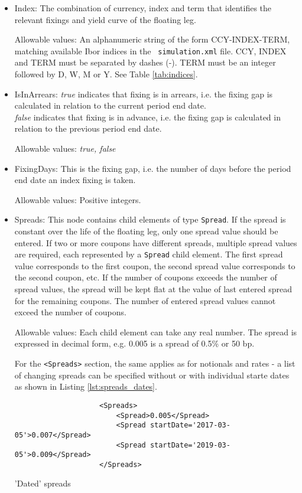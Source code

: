 \begin{itemize}
\item Index:  The combination of currency, index and term that
  identifies the relevant fixings and yield curve of the floating leg.  

  Allowable values: An alphanumeric string of the form CCY-INDEX-TERM, matching available Ibor indices in the {\tt
    simulation.xml} file. CCY, INDEX and TERM must be separated by dashes (-). TERM must be an integer followed by D, W,
  M or Y. See Table \ref{tab:indices}.

\item IsInArrears:  \emph{true} indicates that  fixing is in arrears,
  i.e. the fixing gap is calculated in relation to the current period
  end date.\\ \emph{false} indicates that  fixing is in advance,
  i.e. the fixing gap is calculated in relation to the previous period
  end date.  

Allowable values:  \emph{true, false}

\item FixingDays: This is the fixing gap, i.e. the number of days
  before the period end date an index fixing is taken.   

Allowable values:  Positive integers.  

\item Spreads: This node contains child elements of type
  \lstinline!Spread!. If the spread is constant over the life of the
  floating leg, only one spread value should be entered. If two or more
  coupons have different spreads, multiple spread values are required,
  each represented by a \lstinline!Spread! child element. The first
  spread value corresponds to the first coupon, the second spread
  value corresponds to the second coupon, etc. If the number of
  coupons exceeds the number of spread values, the spread will be kept
  flat at the value of last entered spread for the remaining coupons.
  The number of entered spread values cannot exceed the number of
  coupons. 

  Allowable values: Each child element can take any real number. The spread is expressed in decimal form, e.g. 0.005 is
  a spread of 0.5\% or 50 bp.

For the {\tt <Spreads>} section, the same applies as for notionals and
rates - a list of changing spreads can be specified without or with individual starte dates as shown
in Listing \ref{lst:spreads_dates}.
\begin{listing}[H]
\begin{verbatim}
                    <Spreads>
                        <Spread>0.005</Spread>
                        <Spread startDate='2017-03-05'>0.007</Spread>
                        <Spread startDate='2019-03-05'>0.009</Spread>
                    </Spreads>
\end{verbatim}
\caption{'Dated' spreads}
\label{lst:spreads_dates}
\end{listing}


\end{itemize}
